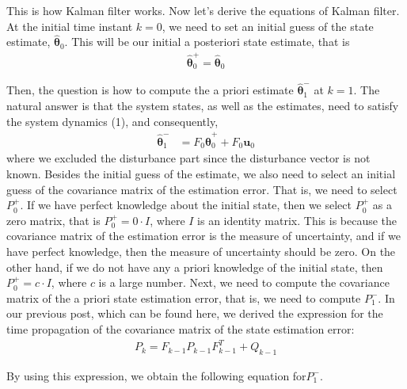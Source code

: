 This is how Kalman filter works. Now let's derive the equations of Kalman filter. At the initial time instant $k=0$, we need to set an initial guess of the state estimate, $\hat{\boldsymbol{\theta}}_{0}$. This will be our initial a posteriori state estimate, that is
\begin{align*}
	\hat{\boldsymbol{\theta}}_{0}^{+}=\hat{\boldsymbol{\theta}}_{0}
\end{align*}

Then, the question is how to compute the a priori estimate $\hat{\boldsymbol{\theta}}_{1}^{-}$ at $k=1$. The natural answer is that the system states, as well as the estimates, need to satisfy the system dynamics (1), and consequently,
\begin{align*}
	\hat{\boldsymbol{\theta}}_{1}^{-}& =F_{0}\hat{\boldsymbol{\theta}}_{0}^{+}+F_{0}\mathbf{u}_{0}
\end{align*}
where we excluded the disturbance part since the disturbance vector is not known. Besides the initial guess of the estimate, we also need to select an initial guess of the covariance matrix of the estimation error. That is, we need to select $P_{0}^{+}$. If we have perfect knowledge about the initial state, then we select $P_{0}^{+}$ as a zero matrix, that is $P_{0}^{+}=0\cdot I$, where $I$ is an identity matrix. This is because the covariance matrix of the estimation error is the measure of uncertainty, and if we have perfect knowledge, then the measure of uncertainty should be zero. On the other hand, if we do not have any a priori knowledge of the initial state, then $P_{0}^{+}=c\cdot I$, where $c$ is a large number. Next, we need to compute the covariance matrix of the a priori state estimation error, that is, we need to compute $P_{1}^{-}$. In our previous post, which can be found here, we derived the expression for the time propagation of the covariance matrix of the state estimation error:
\begin{align*}
	P_{k}=F_{k-1}P_{k-1}F_{k-1}^{T}+Q_{k-1}
\end{align*}



By using this expression, we obtain the following equation for$P_{1}^{-}$.


